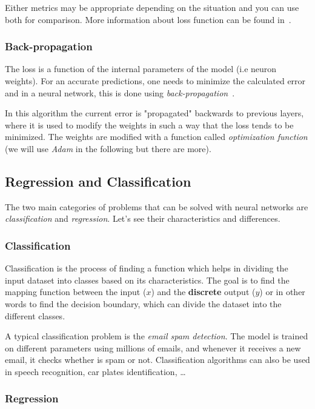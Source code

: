 Either metrics may be appropriate depending on the situation and you can use both for comparison. 
More information about loss function can be found in~\cite{bib:loss_function}.

\subsubsection{Back-propagation}
The loss is a function of the internal parameters of the model (i.e neuron weights). For an accurate predictions, one needs to minimize the calculated error and in a neural network, this is done using
\emph{back-propagation}~\cite{bib:backpropagation}.

In this algorithm the current error is "propagated" backwards to previous layers, where it is used to modify the weights in such a way that the loss tends to be minimized.
The weights are modified with a function called \emph{optimization function} (we will use \emph{Adam} in the following but there are more).

\subsection{Regression and Classification}
\label{regression-and-classification}

The two main categories of problems that can be solved with neural networks are \emph{classification} and \emph{regression}. Let's see their characteristics and differences.

\subsubsection{Classification}
\label{classification}

Classification is the process of finding a function which helps in dividing the input dataset into classes based on its characteristics. 
The goal is to find the mapping function between the input (\(x\)) and the \textbf{discrete} output (\(y\)) or in other words to find the decision boundary, which can divide the dataset into the different classes.

A typical classification problem is the \emph{email spam detection}. The model is trained on different parameters using millions of emails, and whenever it receives a new email, it checks whether is spam or not. Classification algorithms can also be used in speech recognition, car plates identification, \ldots

\subsubsection{Regression}
\label{regression}

